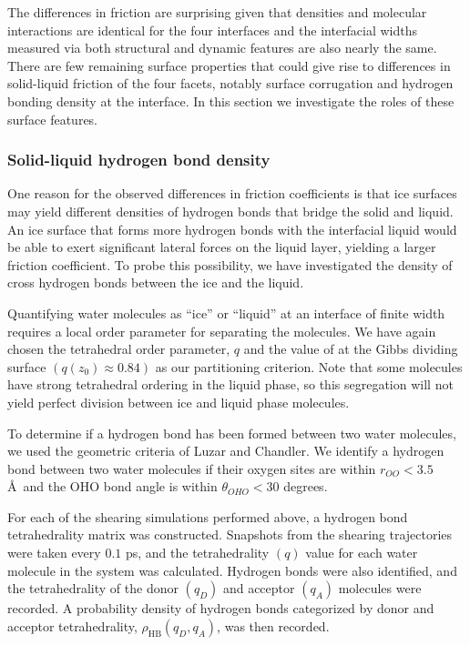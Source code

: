 The differences in friction are surprising given that densities and
molecular interactions are identical for the four interfaces and the
interfacial widths measured via both structural and dynamic features
are also nearly the same. There are few remaining surface properties
that could give rise to differences in solid-liquid friction of the
four facets, notably surface corrugation and hydrogen bonding density
at the interface. In this section we investigate the roles of these
surface features.

\subsubsection{Solid-liquid hydrogen bond density}
One reason for the observed differences in friction
coefficients is that ice surfaces may yield different densities of
hydrogen bonds that bridge the solid and liquid.  An ice surface that
forms more hydrogen bonds with the interfacial liquid would be able to
exert significant lateral forces on the liquid layer, yielding a
larger friction coefficient. To probe this possibility, we have
investigated the density of cross hydrogen bonds between the ice and
the liquid.

Quantifying water molecules as ``ice'' or ``liquid'' at an interface
of finite width requires a local order parameter for separating the
molecules.  We have again chosen the tetrahedral order parameter, $q$
and the value of at the Gibbs dividing surface $(q(z_0) \approx 0.84)$
as our partitioning criterion.  Note that some molecules have strong
tetrahedral ordering in the liquid phase, so this segregation will not
yield perfect division between ice and liquid phase molecules.

To determine if a hydrogen bond has been formed between two water
molecules, we used the geometric criteria of Luzar and
Chandler.\cite{Luzar1996} We identify a hydrogen bond between two
water molecules if their oxygen sites are within $r_{OO} < 3.5$
\AA~and the OHO bond angle is within $\theta_{OHO} < 30$ degrees.

For each of the shearing simulations performed above, a hydrogen bond
tetrahedrality matrix was constructed.  Snapshots from the shearing
trajectories were taken every $0.1$ ps, and the tetrahedrality $(q)$
value for each water molecule in the system was calculated. Hydrogen
bonds were also identified, and the tetrahedrality of the donor
$(q_{D})$ and acceptor $(q_{A})$ molecules were recorded. A
probability density of hydrogen bonds categorized by donor and
acceptor tetrahedrality, $\rho_\mathrm{HB}(q_D, q_A)$, was then
recorded.

